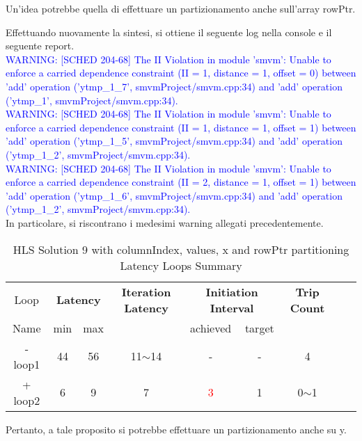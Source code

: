 Un'idea potrebbe quella di effettuare un partizionamento anche sull'array rowPtr.



Effettuando nuovamente la sintesi, si ottiene il seguente log nella console e il seguente report.
\\
\textcolor{blue}{WARNING: [SCHED 204-68] The II Violation in module 'smvm': Unable to enforce a carried dependence constraint (II = 1, distance = 1, offset = 0)
	between 'add' operation ('ytmp\_1\_7', smvmProject/smvm.cpp:34) and 'add' operation ('ytmp\_1', smvmProject/smvm.cpp:34).}
\\
\textcolor{blue}{WARNING: [SCHED 204-68] The II Violation in module 'smvm': Unable to enforce a carried dependence constraint (II = 1, distance = 1, offset = 1)
	between 'add' operation ('ytmp\_1\_5', smvmProject/smvm.cpp:34) and 'add' operation ('ytmp\_1\_2', smvmProject/smvm.cpp:34).}
\\
\textcolor{blue}{WARNING: [SCHED 204-68] The II Violation in module 'smvm': Unable to enforce a carried dependence constraint (II = 2, distance = 1, offset = 1)
	between 'add' operation ('ytmp\_1\_6', smvmProject/smvm.cpp:34) and 'add' operation ('ytmp\_1\_2', smvmProject/smvm.cpp:34).}
\\
In particolare, si riscontrano i medesimi warning allegati precedentemente.

\begin{table}[H]
	\centering
	\begin{tabular}{|c|c|c|c|c|c|c|c|c|}
		\hline
		\multicolumn{1}{|c|}{Loop} & \multicolumn{2}{|c|}{\textbf{Latency}} & \multicolumn{1}{c|}{\textbf{Iteration Latency}} & \multicolumn{2}{c|}{\textbf{Initiation Interval}} & \multicolumn{1}{c|}{\textbf{Trip Count}}  \\
		Name & min & max &  & achieved & target &  \\
		\hline
		- loop1 & 44 & 56 & 11$\sim$14 & - & - & 4 \\
		+ loop2 & 6 & 9 & 7 & \textcolor{red}{3} & 1 & 0$\sim$1 \\
		\hline
	\end{tabular}
	\caption{HLS Solution 9 with columnIndex, values, x and rowPtr partitioning Latency Loops Summary}
	\label{tab:hls-solution-9-columnindex-values-partitioning-loop-summary}
\end{table}

Pertanto, a tale proposito si potrebbe effettuare un partizionamento anche su y.

